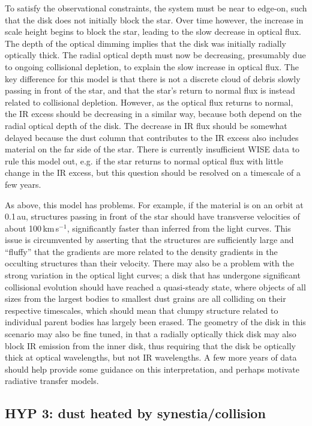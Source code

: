 \documentclass{aa}
\begin{document}
To satisfy the observational constraints, the system must be near to edge-on, such that the disk does not initially block the star.
%
Over time however, the increase in scale height begins to block the star, leading to the slow decrease in optical flux.
%
The depth of the optical dimming implies that the disk was initially radially optically thick.
%
The radial optical depth must now be decreasing, presumably due to ongoing collisional depletion, to explain the slow increase in optical flux.
%
The key difference for this model is that there is not a discrete cloud of debris slowly passing in front of the star, and that the star's return to normal flux is instead related to collisional depletion.
%
However, as the optical flux returns to normal, the IR excess should be decreasing in a similar way, because both depend on the radial optical depth of the disk.
%
The decrease in IR flux should be somewhat delayed because the dust column that contributes to the IR excess also includes material on the far side of the star.
%
There is currently insufficient WISE data to rule this model out, e.g. if the star returns to normal optical flux with little change in the IR excess, but this question should be resolved on a timescale of a few years.

As above, this model has problems.
%
For example, if the material is on an orbit at 0.1\,au, structures passing in front of the star should have transverse velocities of about 100\,km\,s$^{-1}$, significantly faster than inferred from the light curves.
%
This issue is circumvented by asserting that the structures are sufficiently large and ``fluffy'' that the gradients are more related to the density gradients in the occulting structures than their velocity.
%
There may also be a problem with the strong variation in the optical light curves; a disk that has undergone significant collisional evolution should have reached a quasi-steady state, where objects of all sizes from the largest bodies to smallest dust grains are all colliding on their respective timescales, which should mean that clumpy structure related to individual parent bodies has largely been erased.
%
The geometry of the disk in this scenario may also be fine tuned, in that a radially optically thick disk may also block IR emission from the inner disk, thus requiring that the disk be optically thick at optical wavelengths, but not IR wavelengths.
%
A few more years of data should help provide some guidance on this interpretation, and perhaps motivate radiative transfer models.

\subsection{HYP 3: dust heated by synestia/collision} 
\end{document}
